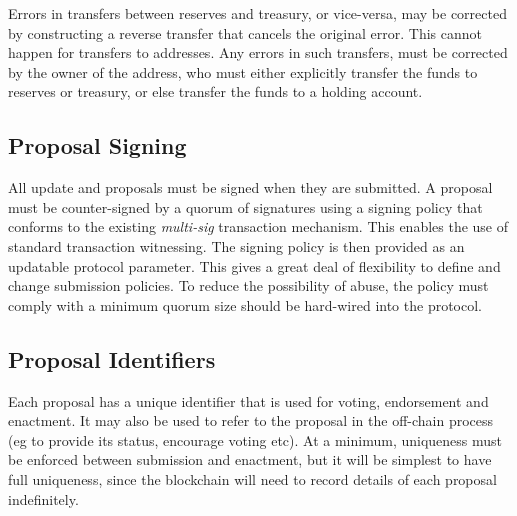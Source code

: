 Errors in transfers between reserves and treasury, or vice-versa, may be corrected by constructing a reverse transfer that cancels the original error.
This cannot happen for transfers to addresses.  Any errors in such transfers, must be corrected by the owner of the address, who must either explicitly transfer
the funds to reserves or treasury, or else transfer the funds to a holding account. 

\subsection{Proposal Signing}

All update and proposals must be signed when they are submitted.  A proposal must be counter-signed by a quorum of signatures using a signing
policy that conforms to the existing \emph{multi-sig} transaction mechanism.  This enables the use of standard transaction witnessing.
The signing policy is then provided as an updatable protocol parameter.  This gives a great deal of flexibility to define and change submission policies.
To reduce the possibility of abuse, the policy must comply with a minimum quorum size should be hard-wired into the protocol.



\subsection{Proposal Identifiers}
\label{sect:proposalid}

Each proposal has a unique identifier that is used for voting, endorsement and enactment.  It may also be used to refer to the proposal in the off-chain process (eg to provide its
status, encourage voting etc).  At a minimum, uniqueness must be enforced between submission and enactment, but it will be simplest to have full uniqueness, since the blockchain will need to record
details of each proposal indefinitely.

